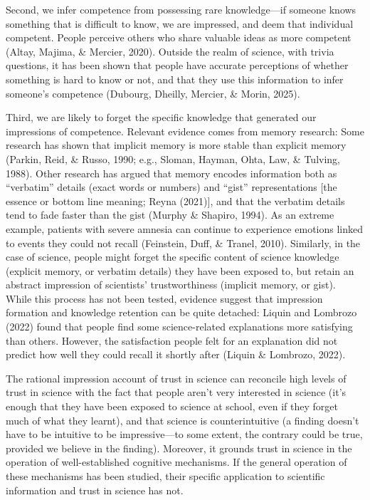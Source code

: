 \documentclass[
  english,
  doc,floatsintext]{apa6}
\begin{document}
Second, we infer competence from possessing rare knowledge---if someone knows something that is difficult to know, we are impressed, and deem that individual competent. People perceive others who share valuable ideas as more competent (Altay, Majima, \& Mercier, 2020). Outside the realm of science, with trivia questions, it has been shown that people have accurate perceptions of whether something is hard to know or not, and that they use this information to infer someone's competence (Dubourg, Dheilly, Mercier, \& Morin, 2025).

Third, we are likely to forget the specific knowledge that generated our impressions of competence. Relevant evidence comes from memory research: Some research has shown that implicit memory is more stable than explicit memory (Parkin, Reid, \& Russo, 1990; e.g., Sloman, Hayman, Ohta, Law, \& Tulving, 1988). Other research has argued that memory encodes information both as ``verbatim'' details (exact words or numbers) and ``gist'' representations {[}the essence or bottom line meaning; Reyna (2021){]}, and that the verbatim details tend to fade faster than the gist (Murphy \& Shapiro, 1994). As an extreme example, patients with severe amnesia can continue to experience emotions linked to events they could not recall (Feinstein, Duff, \& Tranel, 2010). Similarly, in the case of science, people might forget the specific content of science knowledge (explicit memory, or verbatim details) they have been exposed to, but retain an abstract impression of scientists' trustworthiness (implicit memory, or gist). While this process has not been tested, evidence suggest that impression formation and knowledge retention can be quite detached: Liquin and Lombrozo (2022) found that people find some science-related explanations more satisfying than others. However, the satisfaction people felt for an explanation did not predict how well they could recall it shortly after (Liquin \& Lombrozo, 2022).

The rational impression account of trust in science can reconcile high levels of trust in science with the fact that people aren't very interested in science (it's enough that they have been exposed to science at school, even if they forget much of what they learnt), and that science is counterintuitive (a finding doesn't have to be intuitive to be impressive---to some extent, the contrary could be true, provided we believe in the finding). Moreover, it grounds trust in science in the operation of well-established cognitive mechanisms. If the general operation of these mechanisms has been studied, their specific application to scientific information and trust in science has not.
\end{document}
